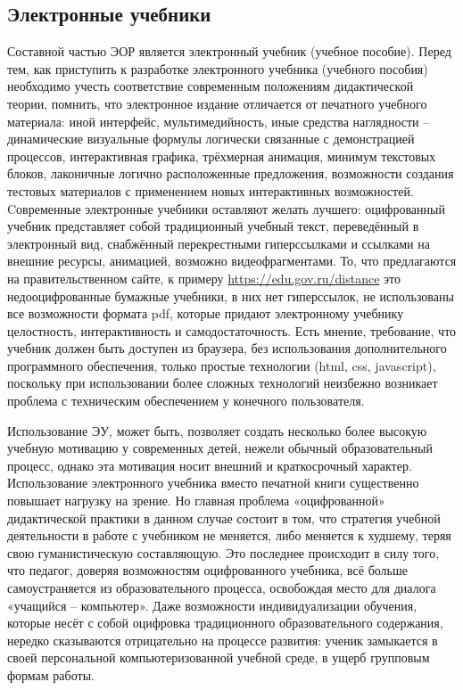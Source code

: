 \subsection{Электронные учебники}

Составной частью ЭОР является электронный учебник (учебное пособие). 
Перед тем, как приступить к разработке электронного учебника (учебного пособия) необходимо учесть соответствие современным положениям дидактической теории, помнить, что электронное издание отличается от печатного учебного материала: иной интерфейс, мультимедийность, иные средства наглядности – динамические визуальные формулы логически связанные с демонстрацией процессов, интерактивная графика, трёхмерная анимация, минимум текстовых блоков, лаконичные логично расположенные предложения, возможности создания тестовых материалов с применением новых интерактивных возможностей\cite{shevardina}.
Cовременные электронные учебники оставляют желать лучшего: оцифрованный учебник представляет собой традиционный учебный текст, переведённый в электронный вид, снабжённый перекрестными гиперссылками и ссылками на внешние ресурсы, анимацией, возможно видеофрагментами. То, что предлагаются на правительственном сайте, к примеру \url{https://edu.gov.ru/distance} это недооцифрованные бумажные учебники, в них нет гиперссылок, не использованы все возможности формата pdf, которые придают электронному учебнику целостность, интерактивность и самодостаточность. 
Есть мнение, требование, что учебник должен быть доступен из браузера, без использования дополнительного программного обеспечения, только простые технологии (html, css, javascript)\cite{hse_comunication}, поскольку при использовании более сложных технологий неизбежно возникает проблема с техническим обеспечением у конечного пользователя. 



Использование ЭУ, может быть, позволяет создать несколько более высокую учебную мотивацию у современных детей, нежели обычный образовательный процесс, однако эта мотивация носит внешний и краткосрочный характер.
Использование электронного учебника вместо печатной книги существенно повышает нагрузку на зрение. Но главная проблема «оцифрованной» дидактической практики в данном случае состоит в том, что стратегия учебной деятельности в работе с учебником не меняется, либо меняется к худшему, теряя свою гуманистическую составляющую. Это последнее происходит в
силу того, что педагог, доверяя возможностям оцифрованного учебника, всё больше самоустраняется из образовательного процесса, освобождая место для диалога «учащийся – компьютер».
Даже возможности индивидуализации обучения, которые несёт с собой оцифровка традиционного образовательного содержания, нередко сказываются отрицательно на процессе развития: ученик замыкается в своей персональной компьютеризованной учебной среде, в ущерб групповым формам работы.

